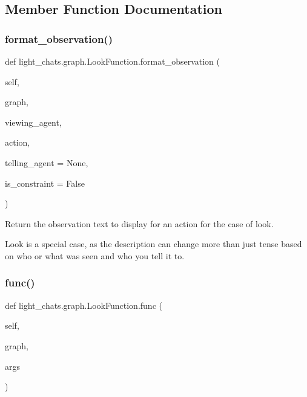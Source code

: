 \subsection{Member Function Documentation}
\mbox{\label{classlight__chats_1_1graph_1_1LookFunction_a7723e1da8ce79443c49fd4a5f6dce978}} 
\subsubsection{\texorpdfstring{format\+\_\+observation()}{format\_observation()}}
{\footnotesize\ttfamily def light\+\_\+chats.\+graph.\+Look\+Function.\+format\+\_\+observation (\begin{DoxyParamCaption}\item[{}]{self,  }\item[{}]{graph,  }\item[{}]{viewing\+\_\+agent,  }\item[{}]{action,  }\item[{}]{telling\+\_\+agent = {\ttfamily None},  }\item[{}]{is\+\_\+constraint = {\ttfamily False} }\end{DoxyParamCaption})}

\begin{DoxyVerb}Return the observation text to display for an action for the case of look.

Look is a special case, as the description can change more than just tense based
on who or what was seen and who you tell it to.
\end{DoxyVerb}
 \mbox{\label{classlight__chats_1_1graph_1_1LookFunction_aeaedd1fa680a930dc86a1120d9daf63d}} 
\subsubsection{\texorpdfstring{func()}{func()}}
{\footnotesize\ttfamily def light\+\_\+chats.\+graph.\+Look\+Function.\+func (\begin{DoxyParamCaption}\item[{}]{self,  }\item[{}]{graph,  }\item[{}]{args }\end{DoxyParamCaption})}



